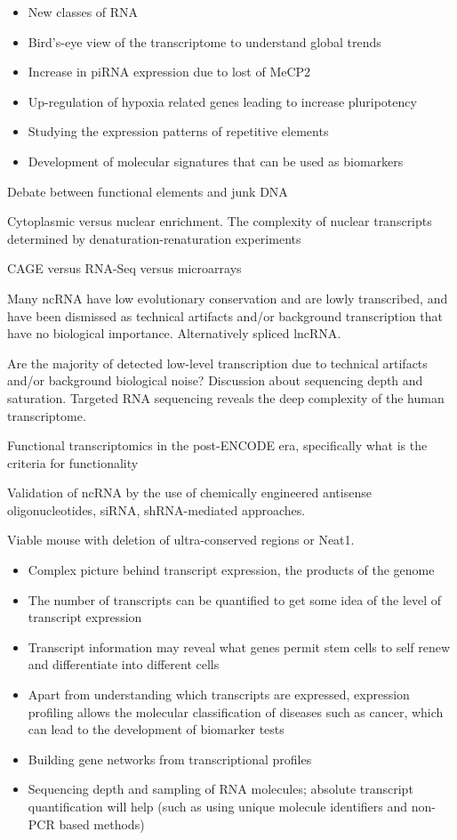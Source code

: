 \begin{itemize}
   \item New classes of RNA
   \item Bird’s-eye view of the transcriptome to understand global trends
   \item Increase in piRNA expression due to lost of MeCP2
   \item Up-regulation of hypoxia related genes leading to increase pluripotency
   \item Studying the expression patterns of repetitive elements
   \item Development of molecular signatures that can be used as biomarkers
\end{itemize}

Debate between functional elements and junk DNA

Cytoplasmic versus nuclear enrichment. The complexity of nuclear transcripts determined by denaturation-renaturation experiments\cite{pmid5969070}

CAGE versus RNA-Seq versus microarrays\cite{pmid24676093}

Many ncRNA have low evolutionary conservation and are lowly transcribed, and have been dismissed as technical artifacts and/or background transcription that have no biological importance. Alternatively spliced lncRNA\cite{Johnsson2013}.

Are the majority of detected low-level transcription due to technical artifacts and/or background biological noise? Discussion about sequencing depth and saturation. Targeted RNA sequencing reveals the deep complexity of the human transcriptome\cite{pmid22081020}.

Functional transcriptomics in the post-ENCODE era, specifically what is the criteria for functionality

Validation of ncRNA by the use of chemically engineered antisense oligonucleotides, siRNA, shRNA-mediated approaches.

Viable mouse with deletion of ultra-conserved regions\cite{pmid17803355} or Neat1\cite{pmid21444682}.

\begin{itemize}
   \item Complex picture behind transcript expression, the products of the genome
   \item The number of transcripts can be quantified to get some idea of the level of transcript expression
   \item Transcript information may reveal what genes permit stem cells to self renew and differentiate into different cells
   \item Apart from understanding which transcripts are expressed, expression profiling allows the molecular classification of diseases such as cancer, which can lead to the development of biomarker tests
   \item Building gene networks from transcriptional profiles
   \item Sequencing depth and sampling of RNA molecules; absolute transcript quantification will help (such as using unique molecule identifiers and non-PCR based methods)
\end{itemize}

